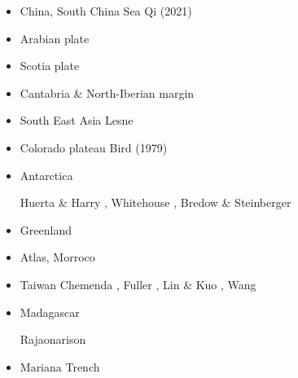 \begin{itemize}
\item China, South China Sea
{\scriptsize
\cite{zhst10}
\cite{wazh15}
\cite{guyr16}
\cite{lixs19}
\cite{dawl20}
Qi \etal (2021) \cite{qill21}
}
\item Arabian plate 
{\scriptsize
\cite{rerl15}
}
\item Scotia plate 
{\scriptsize
\cite{necb13}
\cite{vaga20}
\cite{vasv21}
}
\item Cantabria \& North-Iberian margin 
{\scriptsize
\cite{clbb02}
\cite{peap15}
}
\item South East Asia 
{\scriptsize
Lesne \etal \cite{lecd00}\\
\cite{rekv04}
\cite{yotr15}\cite{hasp15}\cite{meds15}
\cite{necg16}
}
\item Colorado plateau 
{\scriptsize
Bird (1979) \cite{bird79}
\cite{vabv10}
\cite{lesm11}
}
\item Antarctica  

\begin{scriptsize}
Huerta \& Harry \cite{huha07},
Whitehouse \etal \cite{whbl12},
Bredow \& Steinberger \cite{brst21}
\end{scriptsize}

\item Greenland  
{\scriptsize
\cite{stsj15}\cite{heps15}\cite{stbl19}
}
\item Atlas, Morroco  
{\scriptsize
\cite{mica12}
\cite{kava14}
}
\item Taiwan  
{\scriptsize
Chemenda \etal \cite{chys01}, Fuller \etal \cite{fuwf06}, Lin \& Kuo \cite{liku16},
Wang \etal \cite{wakz19}
}
\item Madagascar 
\begin{scriptsize}
\twothousandtwenty Rajaonarison \etal \cite{rasf20} 
\end{scriptsize}

\item Mariana Trench  
{\scriptsize
\cite{zhlb15}
}


\end{itemize}
